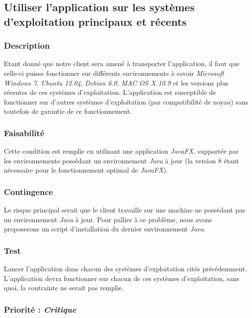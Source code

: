 \subsection{Utiliser l’application sur les systèmes d’exploitation principaux et récents}\label{systems}

\subsubsection{Description}

Etant donné que notre client sera amené à transporter l’application, il faut que celle-ci puisse fonctionner sur différents environnements à savoir \textit{Microsoft Windows 7}, \textit{Ubuntu 12.04}, \textit{Debian 6.0}, \textit{MAC OS X 10.9} et les versions plus récentes de ces systèmes d’exploitation.
L’application est susceptible de fonctionner sur d’autres systèmes d’exploitation (par compatibilité de noyau) sans toutefois de garantie de ce fonctionnement.

\subsubsection{Faisabilité}

Cette condition est remplie en utilisant une application \textit{JavaFX}, supportée par les environnements possédant un environnement \textit{Java} à jour (la version 8 étant nécessaire pour le fonctionnement optimal de \textit{JavaFX}).

\subsubsection{Contingence}

Le risque principal serait que le client travaille sur une machine ne possédant pas un environnement \textit{Java} à jour. Pour pallier à ce problème, nous avons proposerons un script d'installation du dernier environnement \textit{Java}.

\subsubsection{Test}

Lancer l'application dans chacun des systèmes d’exploitation cités précédemment. L'application devra fonctionner sur chacun de ces systèmes d'exploitation, sans quoi, la contrainte ne serait pas remplie.

\subsubsection{Priorité : \textit{Critique}}

